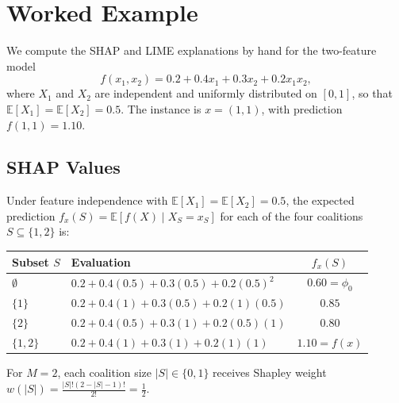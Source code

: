 \section{Worked Example}
\label{app:worked-example}

We compute the SHAP and LIME explanations by hand for the two-feature model
\begin{equation}
    f(x_1, x_2) = 0.2 + 0.4 x_1 + 0.3 x_2 + 0.2 x_1 x_2 ,
\end{equation}
where $X_1$ and $X_2$ are independent and uniformly distributed on $[0, 1]$, so that $\mathbb{E}[X_1] = \mathbb{E}[X_2] = 0.5$. The instance is $x = (1, 1)$, with prediction $f(1, 1) = 1.10$.

\subsection{SHAP Values}
Under feature independence with $\mathbb{E}[X_1] = \mathbb{E}[X_2] = 0.5$, the expected prediction $f_x(S) = \mathbb{E}[f(X) \mid X_S = x_S]$ for each of the four coalitions $S \subseteq \{1, 2\}$ is:

\begin{center}
    \footnotesize
    \setlength{\tabcolsep}{3pt}
    \begin{tabular}{@{}llc@{}}
        \toprule
        Subset $S$ & Evaluation & $f_x(S)$ \\
        \midrule
        $\emptyset$ & $0.2 + 0.4(0.5) + 0.3(0.5) + 0.2(0.5)^2$ & $0.60 = \phi_0$ \\
        $\{1\}$ & $0.2 + 0.4(1) + 0.3(0.5) + 0.2(1)(0.5)$ & $0.85$ \\
        $\{2\}$ & $0.2 + 0.4(0.5) + 0.3(1) + 0.2(0.5)(1)$ & $0.80$ \\
        $\{1, 2\}$ & $0.2 + 0.4(1) + 0.3(1) + 0.2(1)(1)$ & $1.10 = f(x)$ \\
        \bottomrule
    \end{tabular}
\end{center}

For $M = 2$, each coalition size $|S| \in \{0, 1\}$ receives Shapley weight $w(|S|) = \frac{|S|!(2 - |S| - 1)!}{2!} = \frac{1}{2}$. 

